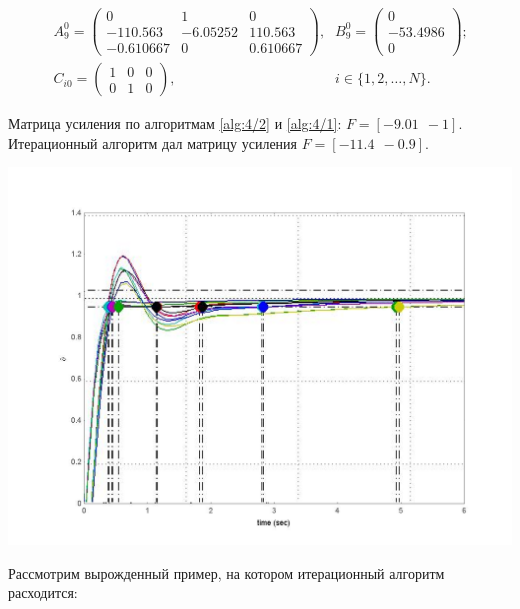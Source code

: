 \begin{equation*}
\begin{array}{lr}
A_9^0 = \left(\begin{array}{ccc}
0    &    1    &    0 \\
-110.563    &    -6.05252    &    110.563 \\
-0.610667    &    0    &    0.610667
\end{array}\right)\mbox{,} &
B_9^0 = \left(\begin{array}{c}
0 \\
-53.4986 \\
0
\end{array}\right)\mbox{;} \\

C_{i0} = \left(\begin{array}{ccc}
1 & 0 & 0 \\
0 & 1 & 0
\end{array}\right)\mbox{,} &
i \in \{1,2,\ldots,N\}.


\end{array}
\end{equation*}


Матрица усиления по алгоритмам \vref{alg:4/2} и \vref{alg:4/1}: $F = [-9.01~~-1]$. Итерационный алгоритм дал матрицу усиления $F=[-11.4~~-0.9]$.

\includegraphics[scale=0.3]{screenshot2.png}

Рассмотрим вырожденный пример, на котором итерационный алгоритм расходится:


